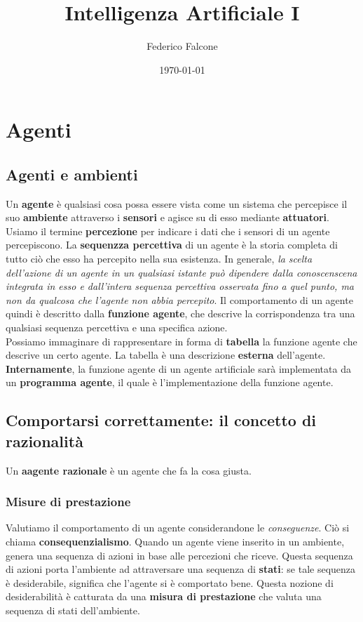 \documentclass{article}
\title{Intelligenza Artificiale I}
\author{Federico Falcone}
\date{\today}
\begin{document}
\maketitle
\section{Agenti}
\subsection{Agenti e ambienti}
Un \textbf{agente} è qualsiasi cosa possa essere vista come un sistema che percepisce il suo \textbf{ambiente} attraverso i \textbf{sensori} e agisce su di esso mediante \textbf{attuatori}.
Usiamo il termine \textbf{percezione} per indicare i dati che i sensori di un agente percepiscono. La \textbf{sequenzza percettiva} di un agente è la storia completa di tutto ciò che esso ha percepito nella sua esistenza. In generale, \textit{la scelta dell'azione di un agente in un qualsiasi istante può dipendere dalla conoscenscena integrata in esso e dall'intera sequenza percettiva osservata fino a quel punto, ma non da qualcosa che l'agente non abbia percepito}. Il comportamento di un agente quindi è descritto dalla \textbf{funzione agente}, che descrive la corrispondenza tra una qualsiasi sequenza percettiva e una specifica azione. \\
Possiamo immaginare di rappresentare in forma di \textbf{tabella}  la funzione agente che descrive un certo agente. La tabella è una descrizione \textbf{esterna} dell'agente. \textbf{Internamente}, la funzione agente di un agente artificiale sarà implementata da un \textbf{programma agente}, il quale è l'implementazione della funzione agente.

\subsection{Comportarsi correttamente: il concetto di razionalità}
Un \textbf{aagente razionale} è un agente che fa la cosa giusta.
\subsubsection{Misure di prestazione}
Valutiamo il comportamento di un agente considerandone le \textit{conseguenze}. Ciò si chiama \textbf{consequenzialismo}. Quando un agente viene inserito in un ambiente, genera una sequenza di azioni in base alle percezioni che riceve. Questa sequenza di azioni porta l'ambiente ad attraversare una sequenza di \textbf{stati}: se tale sequenza è desiderabile, significa che l'agente si è comportato bene. Questa nozione di desiderabilità è catturata da una \textbf{misura di prestazione} che valuta una sequenza di stati dell'ambiente.
\end{document}
